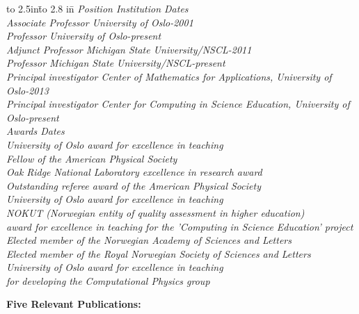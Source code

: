 \begin{center}
\begin{tabbing}
\hbox to 2.5in{}\=\hbox to 2.8 in{}\=\kill
%
\it Position  \>  \it Institution  \> \it Dates  \\
Associate Professor \> University of Oslo-2001 \\
Professor \> University of Oslo-present \\
Adjunct Professor \> Michigan State University/NSCL-2011 \\
Professor \> Michigan State University/NSCL-present \\
Principal investigator \> Center of Mathematics for Applications, University of Oslo-2013 \\
Principal investigator \> Center for Computing in Science Education, University of Oslo-present \\
\it Awards \>  \it   \> \it Dates  \\
University of Oslo award for excellence in teaching \>  \\
Fellow of the American Physical Society \>  \\
Oak Ridge National Laboratory excellence in research award \>  \\
Outstanding referee award of the American Physical Society\>  \\
University of Oslo award for excellence in teaching\>  \\
NOKUT (Norwegian entity of quality assessment in higher education) \>  \\
award for excellence in teaching for the 'Computing in Science Education' project\> \> \\
Elected member of the Norwegian Academy of Sciences and Letters\>  \\
Elected member of the Royal Norwegian Society of Sciences and Letters \>  \\
University of Oslo award for excellence in teaching \> \\
for developing the Computational Physics group \> \> \\
%
%
\end{tabbing}
\end{center}


\noindent
{\bf Five Relevant Publications:}
\vspace*{-8pt}

